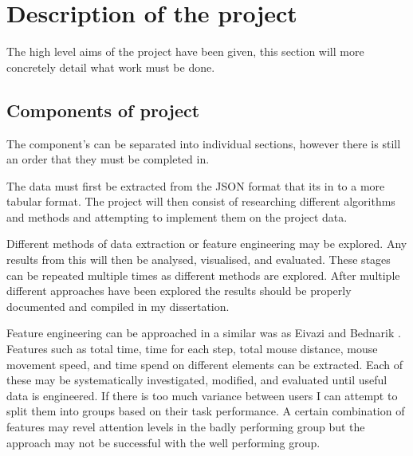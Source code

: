 \documentclass{article}
\begin{document}




\section{Description of the project}

The high level aims of the project have been given, this section will more concretely detail what work must be done. 

\subsection{Components of project}

The component's can be separated into individual sections, however there is still an order that they must be completed in.

The data must first be extracted from the JSON format that its in to a more tabular format.
The project will then consist of researching different algorithms and methods and attempting to implement them on the project data.

Different methods of data extraction or feature engineering may be explored.
Any results from this will then be analysed, visualised, and evaluated.
These stages can be repeated multiple times as different methods are explored.
After multiple different approaches have been explored the results should be properly documented and compiled in my dissertation.


Feature engineering can be approached in a similar was as Eivazi and Bednarik \cite{eivazi2011predicting}.
Features such as total time, time for each step, total mouse distance, mouse movement speed, and time spend on different elements can be extracted.
Each of these may be systematically investigated, modified, and evaluated until useful data is engineered.
If there is too much variance between users I can attempt to split them into groups based on their task performance.
A certain combination of features may revel attention levels in the badly performing group but the approach may not be successful with the well performing group. 
\end{document}
